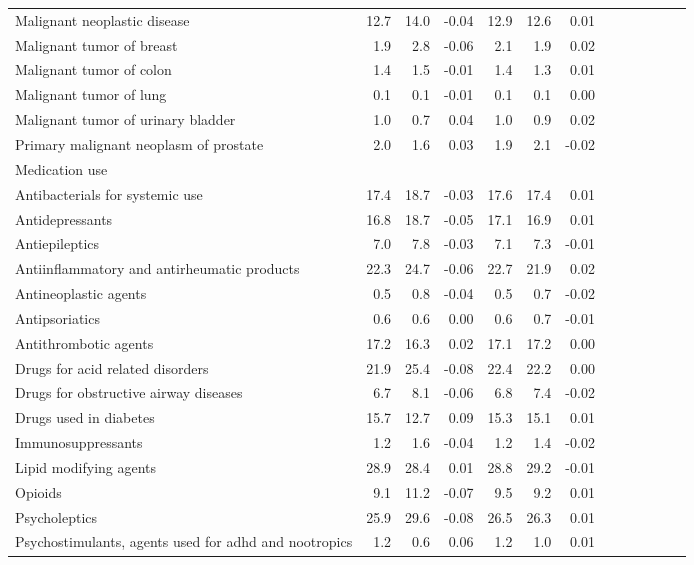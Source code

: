 \documentclass[11pt,]{article}
\begin{document}
\begin{longtable}{lrrrrrrrrrrrr}
      Malignant neoplastic disease & 12.7 & 14.0 & -0.04 & 12.9 &  12.6 &  0.01 \\ 
      Malignant tumor of breast &  1.9 &  2.8 & -0.06 &  2.1 &   1.9 &  0.02 \\ 
      Malignant tumor of colon &  1.4 &  1.5 & -0.01 &  1.4 &   1.3 &  0.01 \\ 
      Malignant tumor of lung &  0.1 &  0.1 & -0.01 &  0.1 &   0.1 &  0.00 \\ 
      Malignant tumor of urinary bladder &  1.0 &  0.7 &  0.04 &  1.0 &   0.9 &  0.02 \\ 
      Primary malignant neoplasm of prostate &  2.0 &  1.6 &  0.03 &  1.9 &   2.1 & -0.02 \\ 
  Medication use &    &    &     &    &     &     \\ 
      Antibacterials for systemic use & 17.4 & 18.7 & -0.03 & 17.6 &  17.4 &  0.01 \\ 
      Antidepressants & 16.8 & 18.7 & -0.05 & 17.1 &  16.9 &  0.01 \\ 
      Antiepileptics &  7.0 &  7.8 & -0.03 &  7.1 &   7.3 & -0.01 \\ 
      Antiinflammatory and antirheumatic products & 22.3 & 24.7 & -0.06 & 22.7 &  21.9 &  0.02 \\ 
      Antineoplastic agents &  0.5 &  0.8 & -0.04 &  0.5 &   0.7 & -0.02 \\ 
      Antipsoriatics &  0.6 &  0.6 &  0.00 &  0.6 &   0.7 & -0.01 \\ 
      Antithrombotic agents & 17.2 & 16.3 &  0.02 & 17.1 &  17.2 &  0.00 \\ 
      Drugs for acid related disorders & 21.9 & 25.4 & -0.08 & 22.4 &  22.2 &  0.00 \\ 
      Drugs for obstructive airway diseases &  6.7 &  8.1 & -0.06 &  6.8 &   7.4 & -0.02 \\ 
      Drugs used in diabetes & 15.7 & 12.7 &  0.09 & 15.3 &  15.1 &  0.01 \\ 
      Immunosuppressants &  1.2 &  1.6 & -0.04 &  1.2 &   1.4 & -0.02 \\ 
      Lipid modifying agents & 28.9 & 28.4 &  0.01 & 28.8 &  29.2 & -0.01 \\ 
      Opioids &  9.1 & 11.2 & -0.07 &  9.5 &   9.2 &  0.01 \\ 
      Psycholeptics & 25.9 & 29.6 & -0.08 & 26.5 &  26.3 &  0.01 \\ 
      Psychostimulants, agents used for adhd and nootropics &  1.2 &  0.6 &  0.06 &  1.2 &   1.0 &  0.01 \\ 
   \bottomrule\end{longtable}
\end{document}

